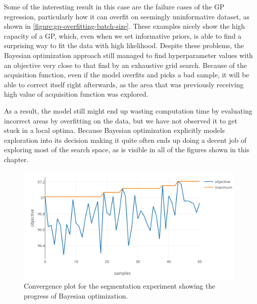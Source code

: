 Some of the interesting result in this case are the failure cases of the GP
regression, particularly how it can overfit on seemingly uninformative dataset,
as shown in \autoref{figure:gp-overfitting-batch-size}. These examples nicely
show the high capacity of a GP, which, even when we set informative priors, is
able to find a surprising way to fit the data with high likelihood. Despite
these problems, the Bayesian optimization approach still managed to find
hyperparameter values with an objective very close to that find by an
exhaustive grid search. Because of the acquisition function, even if the model
overfits and picks a bad sample, it will be able to correct itself right
afterwards, as the area that was previously receiving high value of acquisition
function was explored.

As a result, the model still might end up wasting computation time by
evaluating incorrect areas by overfitting on the data, but we have not observed
it to get stuck in a local optima. Because Bayesian optimization explicitly
models exploration into its decision making it quite often ends up doing a
decent job of exploring most of the search space, as is visible in all of the
figures shown in this chapter.

\begin{figure}
	\begin{center}
		\includegraphics[width=1.0\textwidth]{images/tokenizer-convergence.png}
		\caption{Convergence plot for the segmentation experiment showing the progress of Bayesian optimization.}
		\label{figure:tokenizer-convergence}
	\end{center}
\end{figure}

